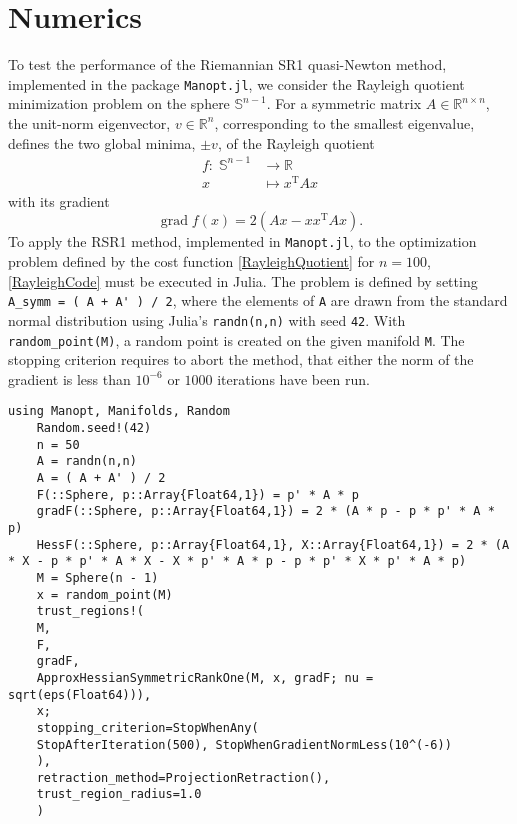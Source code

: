 \chapter{Numerics}

To test the performance of the Riemannian SR1 quasi-Newton method, implemented in the package \lstinline!Manopt.jl!, we consider the Rayleigh quotient minimization problem on the sphere $\mathbb{S}^{n-1}$. For a symmetric matrix $A \in \mathbb{R}^{n \times n}$, the unit-norm eigenvector, $v \in \mathbb{R}^n$, corresponding to the smallest eigenvalue, defines the two global minima, $\pm v$, of the Rayleigh quotient  
\begin{equation}\label{RayleighQuotient}
    \begin{split}
        f \colon \; \mathbb{S}^{n-1} & \to \mathbb{R} \\
        x & \mapsto x^{\mathrm{T}} A x 
    \end{split}
\end{equation}   
with its gradient 
\begin{equation*}
    \operatorname{grad} f(x) = 2(Ax - x x^{\mathrm{T}} A x).
\end{equation*}
To apply the RSR1 method, implemented in \lstinline!Manopt.jl!, to the optimization problem defined by the cost function \cref{RayleighQuotient} for $n=100$, \cref{RayleighCode} must be executed in Julia. The problem is defined by setting \lstinline!A_symm = ( A + A' ) / 2!, where the elements of \lstinline!A! are drawn from the standard normal distribution using Julia’s \lstinline!randn(n,n)! with seed \lstinline!42!. With \lstinline!random_point(M)!, a random point is created on the given manifold \lstinline!M!. The stopping criterion requires to abort the method, that either the norm of the gradient is less than $10^{-6}$ or $1000$ iterations have been run. \\
\begin{lstlisting}[caption={The Rayleigh quotient minimization experiment in Julia for $n = 100$.}, label={RayleighCode}]
    using Manopt, Manifolds, Random
    Random.seed!(42)
    n = 50
    A = randn(n,n)
    A = ( A + A' ) / 2
    F(::Sphere, p::Array{Float64,1}) = p' * A * p
    gradF(::Sphere, p::Array{Float64,1}) = 2 * (A * p - p * p' * A * p)
    HessF(::Sphere, p::Array{Float64,1}, X::Array{Float64,1}) = 2 * (A * X - p * p' * A * X - X * p' * A * p - p * p' * X * p' * A * p)
    M = Sphere(n - 1)
    x = random_point(M)
    trust_regions!(
    M,
    F,
    gradF,
    ApproxHessianSymmetricRankOne(M, x, gradF; nu = sqrt(eps(Float64))),
    x;
    stopping_criterion=StopWhenAny(
    StopAfterIteration(500), StopWhenGradientNormLess(10^(-6))
    ),
    retraction_method=ProjectionRetraction(),
    trust_region_radius=1.0
    )
\end{lstlisting}
